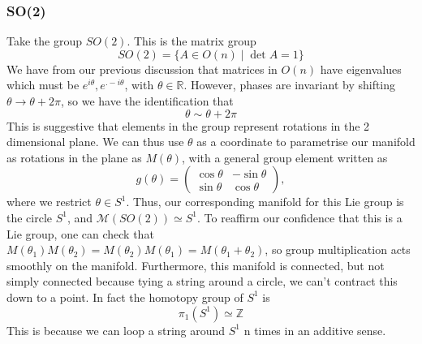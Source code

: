 \documentclass[11pt, oneside]{article}   	%
\theoremstyle{slanted}
\begin{document}
\subsubsection{SO(2)} 
Take the group $SO(2)$. This is the matrix group 
\[ 
	SO(2) = \{A \in O ( n )  \mid \det A = 1 \}  
\] We have from our previous discussion that matrices in $O (n ) $ have eigenvalues which must be $e^{ i \theta}, e^{. -i \theta} $, with $\theta \in \mathbb{R}$. However, phases are invariant by shifting $\theta \rightarrow \theta + 2 \pi$, so we have the identification that 
\[ 
	\theta \sim \theta + 2 \pi 
\] This is suggestive that elements in the group represent rotations in the 2 dimensional plane. We can thus use $\theta$ as a coordinate to parametrise our manifold as rotations in the plane as $M(\theta)$, with a general group element written as 
\[ 
	g(\theta)  = \begin{pmatrix}
	\cos \theta &   - \sin \theta \\
	\sin \theta & \cos \theta
	\end{pmatrix}, 
\]
where we restrict $\theta \in S^1$. Thus, our corresponding manifold for this Lie group is the circle $S^1$, and $\mathcal{M} (SO(2)) \simeq S^1$. 
To reaffirm our confidence that this is a Lie group, one can check that $M ( \theta_1 ) M(\theta_2 )  = M(\theta_2)M(\theta_1) = M(\theta_1 + \theta_2) $, so group multiplication acts smoothly on the manifold. Furthermore, this manifold is connected, but not simply connected because tying a string around a circle, we can't contract this down to a point. In fact the homotopy group of $S^1$ is 
\[ 
	\pi_1 (S^1 ) \simeq \mathbb{Z}
\] This is because we can loop a string around $S^1 $ n times in an additive sense. 
\end{document}
